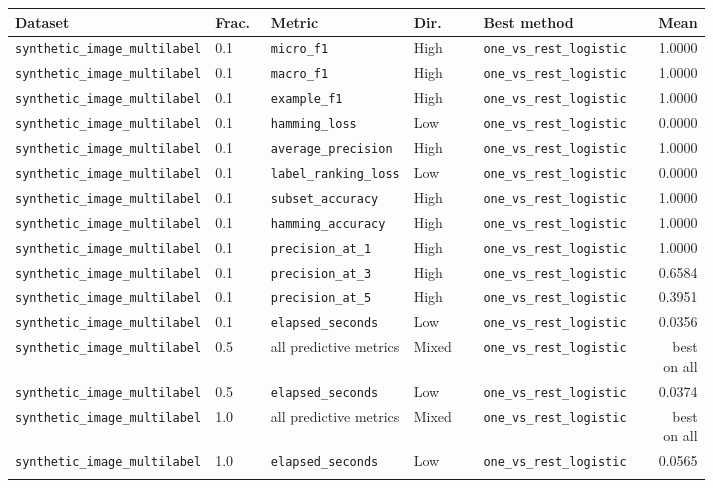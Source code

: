 \documentclass[11pt]{article}
\begin{document}
\begin{longtable}{p{0.18\linewidth} p{0.08\linewidth} p{0.20\linewidth} p{0.10\linewidth} p{0.25\linewidth} r}
\toprule
\textbf{Dataset} & \textbf{Frac.} & \textbf{Metric} & \textbf{Dir.} & \textbf{Best method} & \textbf{Mean} \\
\midrule
\endhead

\texttt{synthetic\_image\_multilabel} & 0.1 & \texttt{micro\_f1} & High & \texttt{one\_vs\_rest\_logistic} & 1.0000 \\
\texttt{synthetic\_image\_multilabel} & 0.1 & \texttt{macro\_f1} & High & \texttt{one\_vs\_rest\_logistic} & 1.0000 \\
\texttt{synthetic\_image\_multilabel} & 0.1 & \texttt{example\_f1} & High & \texttt{one\_vs\_rest\_logistic} & 1.0000 \\
\texttt{synthetic\_image\_multilabel} & 0.1 & \texttt{hamming\_loss} & Low & \texttt{one\_vs\_rest\_logistic} & 0.0000 \\
\texttt{synthetic\_image\_multilabel} & 0.1 & \texttt{average\_precision} & High & \texttt{one\_vs\_rest\_logistic} & 1.0000 \\
\texttt{synthetic\_image\_multilabel} & 0.1 & \texttt{label\_ranking\_loss} & Low & \texttt{one\_vs\_rest\_logistic} & 0.0000 \\
\texttt{synthetic\_image\_multilabel} & 0.1 & \texttt{subset\_accuracy} & High & \texttt{one\_vs\_rest\_logistic} & 1.0000 \\
\texttt{synthetic\_image\_multilabel} & 0.1 & \texttt{hamming\_accuracy} & High & \texttt{one\_vs\_rest\_logistic} & 1.0000 \\
\texttt{synthetic\_image\_multilabel} & 0.1 & \texttt{precision\_at\_1} & High & \texttt{one\_vs\_rest\_logistic} & 1.0000 \\
\texttt{synthetic\_image\_multilabel} & 0.1 & \texttt{precision\_at\_3} & High & \texttt{one\_vs\_rest\_logistic} & 0.6584 \\
\texttt{synthetic\_image\_multilabel} & 0.1 & \texttt{precision\_at\_5} & High & \texttt{one\_vs\_rest\_logistic} & 0.3951 \\
\texttt{synthetic\_image\_multilabel} & 0.1 & \texttt{elapsed\_seconds} & Low & \texttt{one\_vs\_rest\_logistic} & 0.0356 \\
\addlinespace

\texttt{synthetic\_image\_multilabel} & 0.5 & all predictive metrics & Mixed & \texttt{one\_vs\_rest\_logistic} & best on all \\
\texttt{synthetic\_image\_multilabel} & 0.5 & \texttt{elapsed\_seconds} & Low & \texttt{one\_vs\_rest\_logistic} & 0.0374 \\
\texttt{synthetic\_image\_multilabel} & 1.0 & all predictive metrics & Mixed & \texttt{one\_vs\_rest\_logistic} & best on all \\
\texttt{synthetic\_image\_multilabel} & 1.0 & \texttt{elapsed\_seconds} & Low & \texttt{one\_vs\_rest\_logistic} & 0.0565 \\
\addlinespace


\end{longtable}
\end{document}

